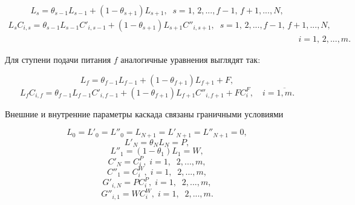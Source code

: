 \begin{equation} \label{GrindEQ__1_24_} 
  L_{s} =\theta _{s-1} L_{s-1} +(1-\theta _{s+1} )L_{s+1} ,\; \; s=1,\, 2,...,f-1,\, f+1,...,N, 
  \end{equation} 
  \begin{equation} \label{GrindEQ__1_25_} 
  \begin{array}{l} {L_{s} C_{i,s} =\theta _{s-1} L_{s-1} C'_{i,s-1} +(1-\theta _{s+1} )L_{s+1} C''_{i,s+1} ,\; \; s=1,\, 2,...,f-1,\, f+1,...,N,} \\ {\; \; \; \; \; \; \; \; \; \; \; \; \; \; \; \; \; \; \; \; \; \; \; \; \; \; \; \; \; \; \; \; \; \quad \quad \quad \quad \quad \; \; \; \; \; \; \; \; \; \; \; \; \; \quad \quad \quad \; \; \; \; \; \; \; \; \; \; \; \; \; \quad \quad \quad \; \; \; \; \; \; \; \; \; \; \; \; \; \quad \quad \; \quad i=1,\, 2,...,m.} \end{array} 
  \end{equation} 

Для ступени подачи питания $f$ аналогичные уравнения выглядят так:

\begin{equation} \label{GrindEQ__1_26_} 
  L_{f} =\theta _{f-1} L_{f-1} +(1-\theta _{f+1} )L_{f+1} +F, 
  \end{equation} 
  \begin{equation} \label{GrindEQ__1_27_} 
  L_{f} C_{i,f} =\theta _{f-1} L_{f-1} C'_{i,f-1} +(1-\theta _{f+1} )L_{f+1} C''_{i,f+1} +FC_{i}^{F} ,\quad i=\overline{1,m}.            
\end{equation}

Внешние и внутренние параметры каскада связаны граничными условиями

\begin{equation} \label{GrindEQ__1_28_} 
  L_{0} =L'_{0} =L''_{0} =L_{N+1} =L'_{N+1} =L''_{N+1} =0, 
  \end{equation} 
  \begin{equation} \label{GrindEQ__1_29_} 
  L'_{N} =\theta _{N} L_{N} =P,        
  \end{equation} 
  \begin{equation} \label{GrindEQ__1_30_} 
  L''_{1} =(1-\theta _{1} )L_{1} =W,        
  \end{equation} 
  \begin{equation} \label{GrindEQ__1_31_} 
  C'_{N} =C_{i}^{P} ,\; i=1,\; \; 2,...,m, 
  \end{equation} 
  \begin{equation} \label{GrindEQ__1_32_} 
  C''_{1} =C_{i}^{W} ,\; i=1,\; \; 2,...,m, 
  \end{equation} 
  \begin{equation} \label{GrindEQ__1_33_} 
  G'_{i,N} =PC_{i}^{P} ,\; i=1,\; \; 2,...,m, 
  \end{equation} 
  \begin{equation} \label{GrindEQ__1_34_} 
  G''_{i,1} =WC_{i}^{W} ,\; i=1,\; \; 2,...,m. 
\end{equation} 


